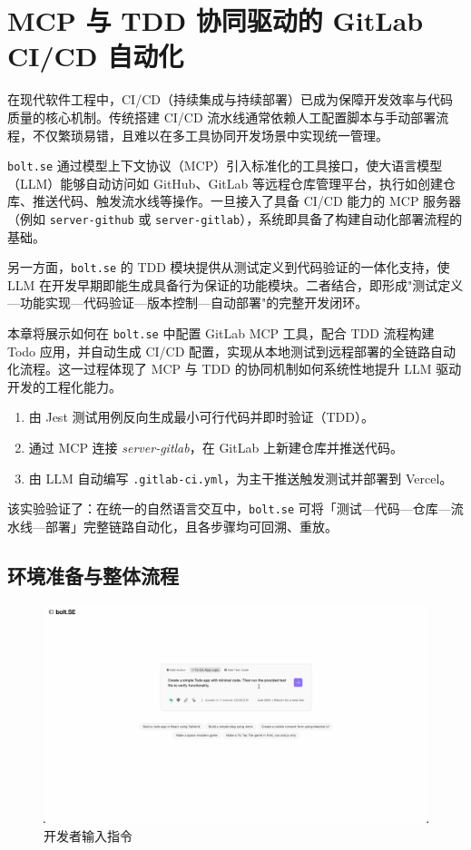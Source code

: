 
\chapter{MCP 与 TDD 协同驱动的 GitLab CI/CD 自动化}
\label{chap:mcp-tdd-cicd}

在现代软件工程中，CI/CD（持续集成与持续部署）已成为保障开发效率与代码质量的核心机制。传统搭建 CI/CD 流水线通常依赖人工配置脚本与手动部署流程，不仅繁琐易错，且难以在多工具协同开发场景中实现统一管理。

\texttt{bolt.se} 通过模型上下文协议（MCP）引入标准化的工具接口，使大语言模型（LLM）能够自动访问如 GitHub、GitLab 等远程仓库管理平台，执行如创建仓库、推送代码、触发流水线等操作。一旦接入了具备 CI/CD 能力的 MCP 服务器（例如 \texttt{server-github} 或 \texttt{server-gitlab}），系统即具备了构建自动化部署流程的基础。

另一方面，\texttt{bolt.se} 的 TDD 模块提供从测试定义到代码验证的一体化支持，使 LLM 在开发早期即能生成具备行为保证的功能模块。二者结合，即形成"测试定义—功能实现—代码验证—版本控制—自动部署"的完整开发闭环。

本章将展示如何在 \texttt{bolt.se} 中配置 GitLab MCP 工具，配合 TDD 流程构建 Todo 应用，并自动生成 CI/CD 配置，实现从本地测试到远程部署的全链路自动化流程。这一过程体现了 MCP 与 TDD 的协同机制如何系统性地提升 LLM 驱动开发的工程化能力。

\begin{enumerate}
  \item 由 Jest 测试用例反向生成最小可行代码并即时验证（TDD）。
  \item 通过 MCP 连接 \emph{server-gitlab}，在 GitLab 上新建仓库并推送代码。
  \item 由 LLM 自动编写 \texttt{.gitlab-ci.yml}，为主干推送触发测试并部署到 Vercel。
\end{enumerate}

该实验验证了：在统一的自然语言交互中，\texttt{bolt.se} 可将「测试—代码—仓库—流水线—部署」完整链路自动化，且各步骤均可回溯、重放。

\section{环境准备与整体流程}
\label{sec:cicd-overview}

\begin{figure}[htbp]
    \centering
    \includegraphics[width=.8\textwidth]{figures/screenshots/ci-cd/ci_prompt.png}
    \caption{开发者输入指令}
    \label{fig:ci_prompt}
\end{figure}


